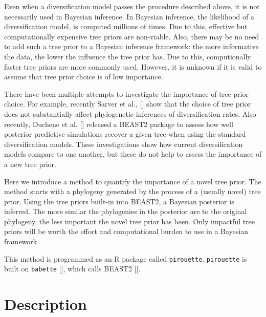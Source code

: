 \documentclass{article}
\begin{document}
Even when a diversification model passes the procedure described above,
it is not necessarily used in Bayesian inference.
In Bayesian inference, the likelihood of a diversification 
model, is computed millions of times.
Due to this, effective but computationally expensive tree priors are non-viable.
Also, there may be no need to add such a tree prior to a Bayesian
inference framework: the more informative the data, 
the lower the influence the tree prior has.
Due to this, computionally faster tree priors are more commonly used.
However, it is unknown if it is valid to assume that tree prior choice is 
of low importance.

There have been multiple attempts to investigate the importance of tree
prior choice. For example, recently Sarver et al., [\cite{sarver2019choice}] 
show that the choice of tree prior does not 
substantially affect phylogenetic inferences of diversification rates.
Also recently, Duchene et al. [\cite{duchene2018phylodynamic}] released
a BEAST2 package to assess how well posterior predictive simulations
recover a given tree when using the standard diversification models.
These investigations show how current diversification models compare
to one another, but these do not help to assess the importance of a 
new tree prior. 

Here we introduce a method to quantify the importance of a novel tree prior.
The method starts with a phylogeny generated by the process of 
a (usually novel) tree prior.
Using the tree priors built-in into BEAST2, 
a Bayesian posterior is inferred.
The more similar the phylogenies in the posterior are to the original phylogeny,
the less important the novel tree prior has been.
Only impactful tree priors will be worth the effort and computational burden 
to use in a Bayesian framework.

This method is programmed as an R package called \verb;pirouette;.
\verb;pirouette; is built on \verb;babette; [\cite{bilderbeek2018babette}], 
which calls BEAST2 [\cite{bouckaert2014beast}]. 

\section{Description}
\end{document}
